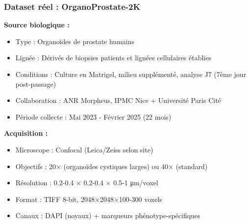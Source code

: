 \subsubsection{Dataset réel : OrganoProstate-2K}

\textbf{Source biologique :}
\begin{itemize}
    \item Type : Organoïdes de prostate humains
    \item Lignée : Dérivés de biopsies patients et lignées cellulaires établies
    \item Conditions : Culture en Matrigel, milieu supplémenté, analyse J7 (7ème jour post-passage)
    \item Collaboration : ANR Morpheus, IPMC Nice + Université Paris Cité
    \item Période collecte : Mai 2023 - Février 2025 (22 mois)
\end{itemize}

\textbf{Acquisition :}
\begin{itemize}
    \item Microscope : Confocal (Leica/Zeiss selon site)
    \item Objectifs : 20× (organoïdes cystiques larges) ou 40× (standard)
    \item Résolution : 0.2-0.4 × 0.2-0.4 × 0.5-1 μm/voxel
    \item Format : TIFF 8-bit, 2048×2048×100-300 voxels
    \item Canaux : DAPI (noyaux) + marqueurs phénotype-spécifiques
\end{itemize}

